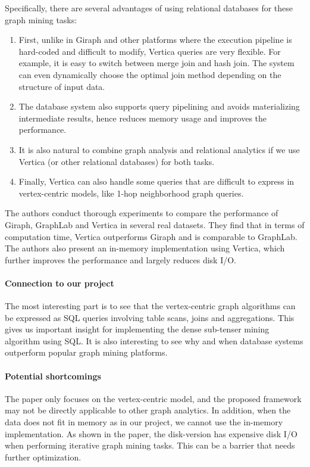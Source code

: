Specifically, there are several advantages of using relational databases for these graph mining tasks: 
\begin{enumerate}
\item
First, unlike in Giraph and other platforms where the execution pipeline is hard-coded and difficult to modify, Vertica queries are very flexible. For example, it is easy to switch between merge join and hash join. The system can even dynamically choose the optimal join method depending on the structure of input data. 

\item The database system also supports query pipelining and avoids materializing intermediate results, hence reduces memory usage and improves the performance. 

\item It is also natural to combine graph analysis and relational analytics if we use Vertica (or other relational databases) for both tasks.

\item Finally, Vertica can also handle some queries that are difficult to express in vertex-centric models, like 1-hop neighborhood graph queries.
\end{enumerate}

The authors conduct thorough experiments to compare the performance of Giraph, GraphLab and Vertica in several real datasets. They find that in terms of computation time, Vertica outperforms Giraph and is comparable to GraphLab. The authors also present an in-memory implementation using Vertica, which further improves the performance and largely reduces disk I/O. 

\paragraph{Connection to our project} The most interesting part is to see that the vertex-centric graph algorithms can be expressed as SQL queries involving table scans, joins and aggregations. This gives us important insight for implementing the dense sub-tenser mining algorithm using SQL. It is also interesting to see why and when database systems outperform popular graph mining platforms.  

\paragraph{Potential shortcomings} The paper only  focuses on the vertex-centric model, and the proposed framework may not be directly applicable to other graph analytics. In addition, when the data does not fit in memory as in our project, we cannot use the in-memory implementation. As shown in the paper, the disk-version has expensive disk I/O when performing iterative graph mining tasks. This can be a barrier that needs further optimization.  


